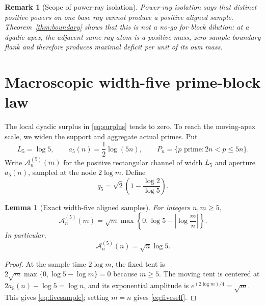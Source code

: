 \documentclass[11pt]{article}
\newtheorem{lemma}[theorem]{Lemma}
\newtheorem{remark}[theorem]{Remark}
\newcommand{\A}{\mathcal A}
\begin{document}
\begin{remark}[Scope of power-ray isolation]
Power-ray isolation says that distinct positive powers on one base ray cannot produce a
\emph{positive} aligned sample.  Theorem~\ref{thm:boundary} shows that this is not a no-go for block
dilution: at a dyadic apex, the adjacent same-ray atom is a positive-mass, zero-sample boundary
flank and therefore produces maximal deficit per unit of its own mass.
\end{remark}

\section{Macroscopic width-five prime-block law}\label{sec:macro}\leavevmode\par

The local dyadic surplus in \eqref{eq:surplus} tends to zero.  To reach the moving-apex scale, we
widen the support and aggregate actual primes.  Put
\begin{equation}\label{eq:fiveobjects}
 L_5=\log5,\qquad
 a_5(n)=\frac12\log(5n),\qquad
 P_n=\{p\text{ prime}:2n<p\le5n\}.
\end{equation}
Write $\A_n^{(5)}(m)$ for the positive rectangular channel of width $L_5$ and aperture $a_5(n)$,
sampled at the node $2\log m$.  Define
\begin{equation}\label{eq:qfive}
 q_5=\sqrt2\left(1-\frac{\log2}{\log5}\right).
\end{equation}

\begin{lemma}[Exact width-five aligned samples]\label{lem:fivesample}
For integers $n,m\ge5$,
\begin{equation}\label{eq:fivesample}
 \A_n^{(5)}(m)
 =\sqrt m\max\!\left\{0,\log5-\left|\log\frac mn\right|\right\}.
\end{equation}
In particular,
\begin{equation}\label{eq:fiveself}
 \A_n^{(5)}(n)=\sqrt n\log5.
\end{equation}
\end{lemma}

\begin{proof}
At the sample time $2\log m$, the fixed tent is
$2\sqrt m\max\{0,\log5-\log m\}=0$ because $m\ge5$.  The moving tent is centered at
$2a_5(n)-\log5=\log n$, and its exponential amplitude is
$e^{(2\log m)/4}=\sqrt m$.  This gives \eqref{eq:fivesample}; setting $m=n$ gives
\eqref{eq:fiveself}.
\end{proof}
\end{document}
